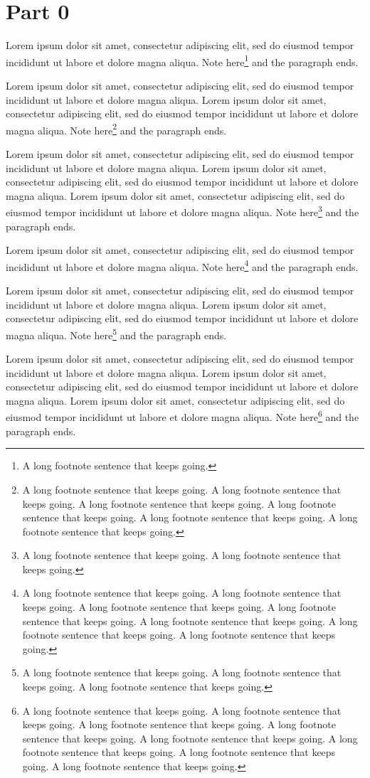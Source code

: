 \documentclass{article}
\begin{document}
\section{Part 0}
Lorem ipsum dolor sit amet, consectetur adipiscing elit, sed do eiusmod tempor incididunt ut labore et dolore magna aliqua. Note here\footnote{A long footnote sentence that keeps going. } and the paragraph ends.

Lorem ipsum dolor sit amet, consectetur adipiscing elit, sed do eiusmod tempor incididunt ut labore et dolore magna aliqua. Lorem ipsum dolor sit amet, consectetur adipiscing elit, sed do eiusmod tempor incididunt ut labore et dolore magna aliqua. Note here\footnote{A long footnote sentence that keeps going. A long footnote sentence that keeps going. A long footnote sentence that keeps going. A long footnote sentence that keeps going. A long footnote sentence that keeps going. A long footnote sentence that keeps going. } and the paragraph ends.

Lorem ipsum dolor sit amet, consectetur adipiscing elit, sed do eiusmod tempor incididunt ut labore et dolore magna aliqua. Lorem ipsum dolor sit amet, consectetur adipiscing elit, sed do eiusmod tempor incididunt ut labore et dolore magna aliqua. Lorem ipsum dolor sit amet, consectetur adipiscing elit, sed do eiusmod tempor incididunt ut labore et dolore magna aliqua. Note here\footnote{A long footnote sentence that keeps going. A long footnote sentence that keeps going. } and the paragraph ends.

Lorem ipsum dolor sit amet, consectetur adipiscing elit, sed do eiusmod tempor incididunt ut labore et dolore magna aliqua. Note here\footnote{A long footnote sentence that keeps going. A long footnote sentence that keeps going. A long footnote sentence that keeps going. A long footnote sentence that keeps going. A long footnote sentence that keeps going. A long footnote sentence that keeps going. A long footnote sentence that keeps going. } and the paragraph ends.

Lorem ipsum dolor sit amet, consectetur adipiscing elit, sed do eiusmod tempor incididunt ut labore et dolore magna aliqua. Lorem ipsum dolor sit amet, consectetur adipiscing elit, sed do eiusmod tempor incididunt ut labore et dolore magna aliqua. Note here\footnote{A long footnote sentence that keeps going. A long footnote sentence that keeps going. A long footnote sentence that keeps going. } and the paragraph ends.

Lorem ipsum dolor sit amet, consectetur adipiscing elit, sed do eiusmod tempor incididunt ut labore et dolore magna aliqua. Lorem ipsum dolor sit amet, consectetur adipiscing elit, sed do eiusmod tempor incididunt ut labore et dolore magna aliqua. Lorem ipsum dolor sit amet, consectetur adipiscing elit, sed do eiusmod tempor incididunt ut labore et dolore magna aliqua. Note here\footnote{A long footnote sentence that keeps going. A long footnote sentence that keeps going. A long footnote sentence that keeps going. A long footnote sentence that keeps going. A long footnote sentence that keeps going. A long footnote sentence that keeps going. A long footnote sentence that keeps going. A long footnote sentence that keeps going. } and the paragraph ends.
\end{document}

